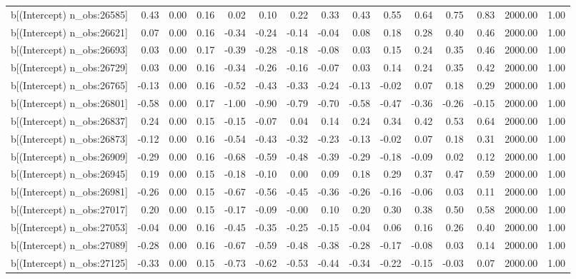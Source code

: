 \begin{table}[ht]
\begin{tabular}{rrrrrrrrrrrrrrr}
  b[(Intercept) n\_obs:26585] & 0.43 & 0.00 & 0.16 & 0.02 & 0.10 & 0.22 & 0.33 & 0.43 & 0.55 & 0.64 & 0.75 & 0.83 & 2000.00 & 1.00 \\ 
  b[(Intercept) n\_obs:26621] & 0.07 & 0.00 & 0.16 & -0.34 & -0.24 & -0.14 & -0.04 & 0.08 & 0.18 & 0.28 & 0.40 & 0.46 & 2000.00 & 1.00 \\ 
  b[(Intercept) n\_obs:26693] & 0.03 & 0.00 & 0.17 & -0.39 & -0.28 & -0.18 & -0.08 & 0.03 & 0.15 & 0.24 & 0.35 & 0.46 & 2000.00 & 1.00 \\ 
  b[(Intercept) n\_obs:26729] & 0.03 & 0.00 & 0.16 & -0.34 & -0.26 & -0.16 & -0.07 & 0.03 & 0.14 & 0.24 & 0.35 & 0.42 & 2000.00 & 1.00 \\ 
  b[(Intercept) n\_obs:26765] & -0.13 & 0.00 & 0.16 & -0.52 & -0.43 & -0.33 & -0.24 & -0.13 & -0.02 & 0.07 & 0.18 & 0.29 & 2000.00 & 1.00 \\ 
  b[(Intercept) n\_obs:26801] & -0.58 & 0.00 & 0.17 & -1.00 & -0.90 & -0.79 & -0.70 & -0.58 & -0.47 & -0.36 & -0.26 & -0.15 & 2000.00 & 1.00 \\ 
  b[(Intercept) n\_obs:26837] & 0.24 & 0.00 & 0.15 & -0.15 & -0.07 & 0.04 & 0.14 & 0.24 & 0.34 & 0.42 & 0.53 & 0.64 & 2000.00 & 1.00 \\ 
  b[(Intercept) n\_obs:26873] & -0.12 & 0.00 & 0.16 & -0.54 & -0.43 & -0.32 & -0.23 & -0.13 & -0.02 & 0.07 & 0.18 & 0.31 & 2000.00 & 1.00 \\ 
  b[(Intercept) n\_obs:26909] & -0.29 & 0.00 & 0.16 & -0.68 & -0.59 & -0.48 & -0.39 & -0.29 & -0.18 & -0.09 & 0.02 & 0.12 & 2000.00 & 1.00 \\ 
  b[(Intercept) n\_obs:26945] & 0.19 & 0.00 & 0.15 & -0.18 & -0.10 & 0.00 & 0.09 & 0.18 & 0.29 & 0.37 & 0.47 & 0.59 & 2000.00 & 1.00 \\ 
  b[(Intercept) n\_obs:26981] & -0.26 & 0.00 & 0.15 & -0.67 & -0.56 & -0.45 & -0.36 & -0.26 & -0.16 & -0.06 & 0.03 & 0.11 & 2000.00 & 1.00 \\ 
  b[(Intercept) n\_obs:27017] & 0.20 & 0.00 & 0.15 & -0.17 & -0.09 & -0.00 & 0.10 & 0.20 & 0.30 & 0.38 & 0.50 & 0.58 & 2000.00 & 1.00 \\ 
  b[(Intercept) n\_obs:27053] & -0.04 & 0.00 & 0.16 & -0.45 & -0.35 & -0.25 & -0.15 & -0.04 & 0.06 & 0.16 & 0.26 & 0.40 & 2000.00 & 1.00 \\ 
  b[(Intercept) n\_obs:27089] & -0.28 & 0.00 & 0.16 & -0.67 & -0.59 & -0.48 & -0.38 & -0.28 & -0.17 & -0.08 & 0.03 & 0.14 & 2000.00 & 1.00 \\ 
  b[(Intercept) n\_obs:27125] & -0.33 & 0.00 & 0.15 & -0.73 & -0.62 & -0.53 & -0.44 & -0.34 & -0.22 & -0.15 & -0.03 & 0.07 & 2000.00 & 1.00 \\ 

\end{tabular}
\end{table}
